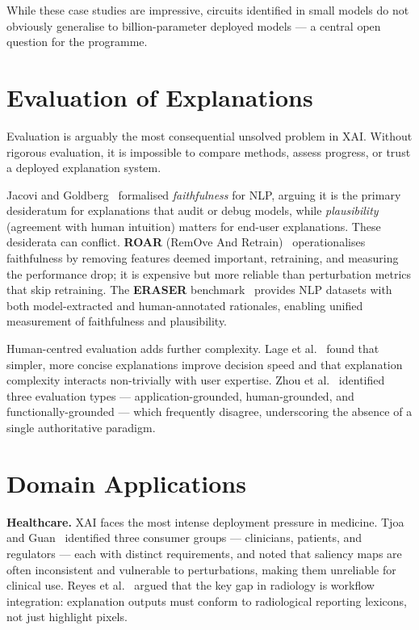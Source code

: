 \documentclass[12pt]{article}
\begin{document}
While these case studies are impressive, circuits identified in small models do not
obviously generalise to billion-parameter deployed models --- a central open
question for the programme.

\section{Evaluation of Explanations}
\label{sec:eval}

Evaluation is arguably the most consequential unsolved problem in XAI. Without
rigorous evaluation, it is impossible to compare methods, assess progress, or
trust a deployed explanation system.

Jacovi and Goldberg~\cite{jacovi2020faithfully} formalised \emph{faithfulness} for
NLP, arguing it is the primary desideratum for explanations that audit or debug
models, while \emph{plausibility} (agreement with human intuition) matters for
end-user explanations. These desiderata can conflict. \textbf{ROAR} (RemOve And
Retrain)~\cite{hooker2019roar} operationalises faithfulness by removing features
deemed important, retraining, and measuring the performance drop; it is expensive
but more reliable than perturbation metrics that skip retraining. The
\textbf{ERASER} benchmark~\cite{deyoung2020eraser} provides NLP datasets with
both model-extracted and human-annotated rationales, enabling unified measurement
of faithfulness and plausibility.

Human-centred evaluation adds further complexity. Lage et
al.~\cite{lage2019evaluation} found that simpler, more concise explanations improve
decision speed and that explanation complexity interacts non-trivially with user
expertise. Zhou et al.~\cite{zhou2021evaluating} identified three evaluation types
--- application-grounded, human-grounded, and functionally-grounded --- which
frequently disagree, underscoring the absence of a single authoritative paradigm.

\section{Domain Applications}
\label{sec:apps}

\textbf{Healthcare.} XAI faces the most intense deployment pressure in medicine.
Tjoa and Guan~\cite{tjoa2021survey} identified three consumer groups --- clinicians,
patients, and regulators --- each with distinct requirements, and noted that
saliency maps are often inconsistent and vulnerable to perturbations, making them
unreliable for clinical use. Reyes et al.~\cite{reyes2020interpretability} argued
that the key gap in radiology is workflow integration: explanation outputs must
conform to radiological reporting lexicons, not just highlight pixels.
\end{document}
